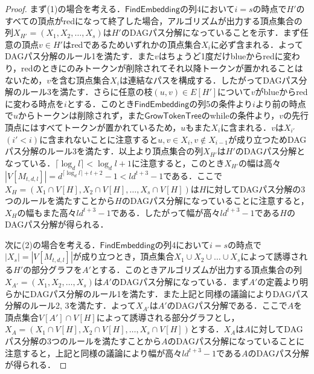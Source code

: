 \documentclass[master]{kuisthesis}		%
\theoremstyle{plain}
\theoremstyle{definition}
\begin{document}
\begin{proof}
まず(1)の場合を考える．$\mathsf{FindEmbedding}$の列4において$i=s$の時点で$H'$のすべての頂点がredになって終了した場合，アルゴリズムが出力する頂点集合の列$X_{H'} = (X_1, X_2, \dots , X_s)$は$H'$のDAGパス分解になっていることを示す．まず任意の頂点$v \in H'$はredであるためいずれかの頂点集合$X_i$に必ず含まれる．よってDAGパス分解のルール1を満たす．また$v$はちょうど1度だけblueからredに変わり，redのときにのみトークンが削除されてそれ以降トークンが置かれることはないため，$v$を含む頂点集合$X_i$は連結なパスを構成する．したがってDAGパス分解のルール3を満たす．さらに任意の枝$(u, v) \in E[H']$について$v$がblueからredに変わる時点を$i$とする．このとき$\mathsf{FindEmbedding}$の列5の条件より$i$より前の時点で$u$からトークンは削除されず，また$\mathsf{GrowTokenTree}$のwhileの条件より，$v$の先行頂点にはすべてトークンが置かれているため，$u$もまた$X_i$に含まれる．$v$は$X_{i'}$ $(i' < i)$に含まれないことに注意すると$u, v \in X_i, v \notin X_{i-1}$が成り立つためDAGパス分解のルール3を満たす．以上より頂点集合の列$X_{H'}$は$H'$のDAGパス分解となっている．$\lceil \log_d l \rceil < \log_d l +1$に注意すると，このとき$X_{H'}$の幅は高々$|V[M_{t, d, l}]| = d^{\lceil \log_d l \rceil +t+2}-1 < ld^{t+3}-1$である．ここで$X_H = (X_1 \cap V[H], X_2 \cap V[H], \dots , X_s \cap V[H])$は$H$に対してDAGパス分解の3つのルールを満たすことから$H$のDAGパス分解になっていることに注意すると，$X_H$の幅もまた高々$ld^{t+3}-1$である．したがって幅が高々$ld^{t+3}-1$である$H$のDAGパス分解が得られる．

次に(2)の場合を考える．$\mathsf{FindEmbedding}$の列4において$i=s$の時点で$|X_s| = |V[M_{t, d, l}]|$が成り立つとき，頂点集合$X_1 \cup X_2 \cup \dots \cup X_s$によって誘導される$H'$の部分グラフを$A'$とする．このときアルゴリズムが出力する頂点集合の列$X_{A'} = (X_1, X_2, \dots , X_s)$は$A'$のDAGパス分解になっている．まず$A'$の定義より明らかにDAGパス分解のルール1を満たす．また上記と同様の議論によりDAGパス分解のルール2, 3を満たす．よって$X_{A'}$は$A'$のDAGパス分解である．ここで$A$を頂点集合$V[A'] \cap V[H]$によって誘導される部分グラフとし，$X_A = (X_1 \cap V[H], X_2 \cap V[H], \dots , X_s \cap V[H])$とする．$X_A$は$A$に対してDAGパス分解の3つのルールを満たすことから$A$のDAGパス分解になっていることに注意すると，上記と同様の議論により幅が高々$ld^{t+3}-1$である$A$のDAGパス分解が得られる．


\end{proof}
\end{document}
